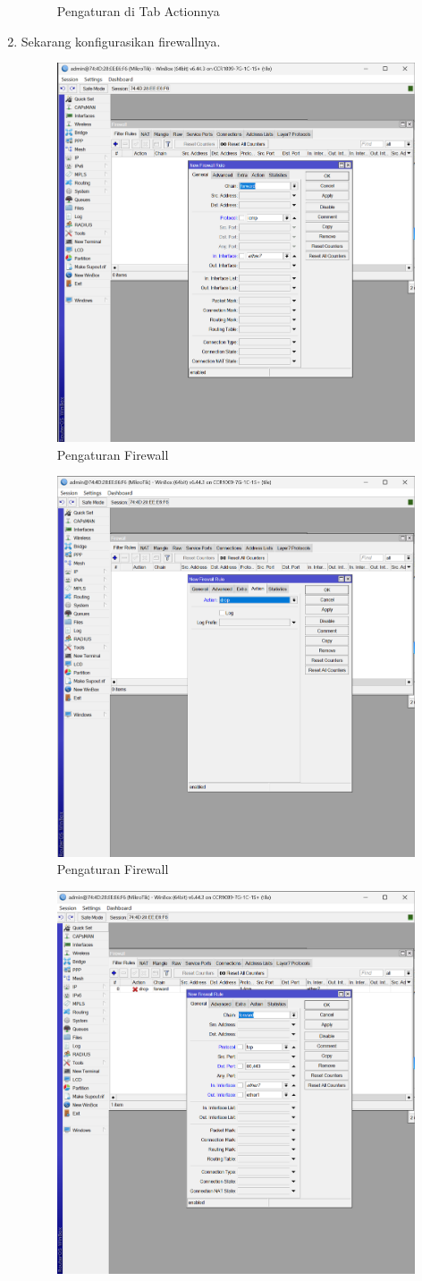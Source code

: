 \begin{enumerate}
\begin{figure}[H]
        \caption{Pengaturan di Tab Actionnya}
        \label{fig:gambar4}
    \end{figure}
    \item Sekarang konfigurasikan firewallnya.
     \begin{figure}[H]
        \centering
        \includegraphics[width=0.5\linewidth]{P1/img/14.png}
        \caption{Pengaturan Firewall}
        \label{fig:gambar4}
    \end{figure}
     \begin{figure}[H]
        \centering
        \includegraphics[width=0.5\linewidth]{P1/img/15.png}
        \caption{Pengaturan Firewall}
        \label{fig:gambar4}
    \end{figure}
     \begin{figure}[H]
        \centering
        \includegraphics[width=0.5\linewidth]{P1/img/16.png}

\end{figure}
\end{enumerate}
